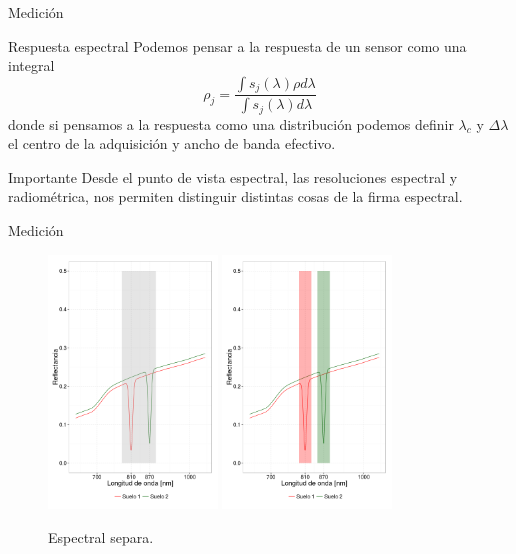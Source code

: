 \documentclass[handout]{beamer}
\begin{document}
\begin{frame}{Medici\'on}
  \begin{block}{Respuesta espectral}
    Podemos pensar a la respuesta de un sensor como una integral
      $$\rho_{j} =\frac{\int s_j(\lambda) \rho d\lambda}{\int s_j(\lambda) d\lambda}$$
    donde si pensamos a la respuesta como una distribuci\'on podemos definir $\lambda_c$ y $\Delta \lambda$ el centro de la adquisici\'on y ancho de banda efectivo.
  \end{block}\pause
  \begin{alertblock}{Importante}
    Desde el punto de vista espectral, las resoluciones espectral y radiom\'etrica, nos permiten distinguir distintas cosas de la firma espectral.
  \end{alertblock}
\end{frame}

\begin{frame}{Medici\'on}
  \begin{figure}\centering
    \includegraphics[width=0.4\textwidth]{imagenes/ebaja.png}\phantom{F}
    \includegraphics[width=0.4\textwidth]{imagenes/ealta.png}
    \caption{Espectral separa.}
  \end{figure}
\end{frame}
\end{document}
